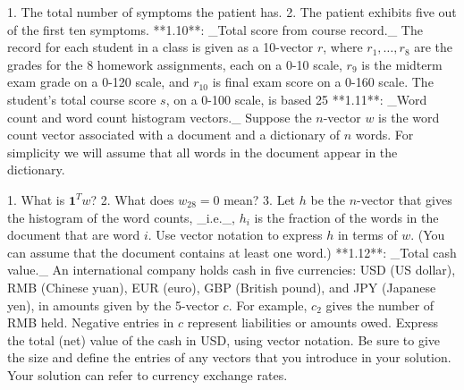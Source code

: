 1. The total number of symptoms the patient has.
2. The patient exhibits five out of the first ten symptoms.
**1.10**: _Total score from course record._ The record for each student in a class is given as a 10-vector \(r\), where \(r_{1},\ldots,r_{8}\) are the grades for the 8 homework assignments, each on a 0-10 scale, \(r_{9}\) is the midterm exam grade on a 0-120 scale, and \(r_{10}\) is final exam score on a 0-160 scale. The student's total course score \(s\), on a 0-100 scale, is based 25%
**1.11**: _Word count and word count histogram vectors._ Suppose the \(n\)-vector \(w\) is the word count vector associated with a document and a dictionary of \(n\) words. For simplicity we will assume that all words in the document appear in the dictionary.

1. What is \(\mathbf{1}^{T}w\)?
2. What does \(w_{28}=0\) mean?
3. Let \(h\) be the \(n\)-vector that gives the histogram of the word counts, _i.e._, \(h_{i}\) is the fraction of the words in the document that are word \(i\). Use vector notation to express \(h\) in terms of \(w\). (You can assume that the document contains at least one word.)
**1.12**: _Total cash value._ An international company holds cash in five currencies: USD (US dollar), RMB (Chinese yuan), EUR (euro), GBP (British pound), and JPY (Japanese yen), in amounts given by the 5-vector \(c\). For example, \(c_{2}\) gives the number of RMB held. Negative entries in \(c\) represent liabilities or amounts owed. Express the total (net) value of the cash in USD, using vector notation. Be sure to give the size and define the entries of any vectors that you introduce in your solution. Your solution can refer to currency exchange rates.

